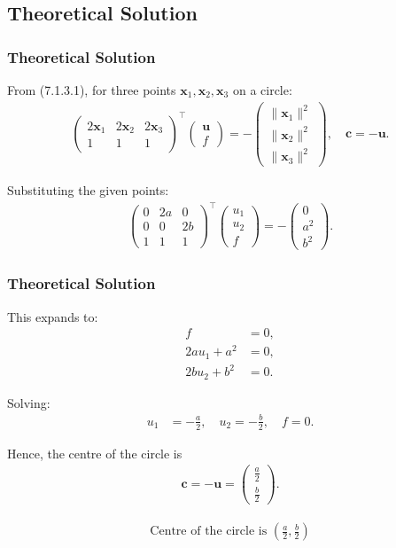\documentclass{beamer}
\theoremstyle{remark}
\newcommand{\myvec}[1]{\ensuremath{\begin{pmatrix}#1\end{pmatrix}}}
\let\vec\mathbf
\numberwithin{equation}{section}
\begin{document}
\subsection{Theoretical Solution }
\begin{frame}
\frametitle{Theoretical Solution}
From (7.1.3.1), for three points $\vec{x}_1, \vec{x}_2, \vec{x}_3$ on a circle:
\begin{align}
\myvec{
2\vec{x}_1 & 2\vec{x}_2 & 2\vec{x}_3 \\
1 & 1 & 1
}^\top
\myvec{\vec{u} \\ f}
=
-\myvec{\|\vec{x}_1\|^2 \\ \|\vec{x}_2\|^2 \\ \|\vec{x}_3\|^2},
\quad
\vec{c} = -\vec{u}.
\end{align}

Substituting the given points:
\begin{align}
\myvec{
0 & 2a & 0 \\
0 & 0 & 2b \\
1 & 1 & 1
}^\top
\myvec{u_1 \\ u_2 \\ f}
=
-\myvec{0 \\ a^2 \\ b^2}.
\end{align}

\end{frame}

\begin{frame}
\frametitle{Theoretical Solution}
This expands to:
\begin{align}
f &= 0, \\
2au_1 + a^2 &= 0, \\
2bu_2 + b^2 &= 0.
\end{align}

Solving:
\begin{align}
u_1 &= -\frac{a}{2}, \quad
u_2 = -\frac{b}{2}, \quad
f = 0.
\end{align}

Hence, the centre of the circle is
\begin{align}
\vec{c} = -\vec{u} = \myvec{\tfrac{a}{2} \\ \tfrac{b}{2}}.
\end{align}

\begin{align}
\boxed{\text{Centre of the circle is } \left(\tfrac{a}{2}, \tfrac{b}{2}\right)}
\end{align}

\end{frame}
\end{document}
